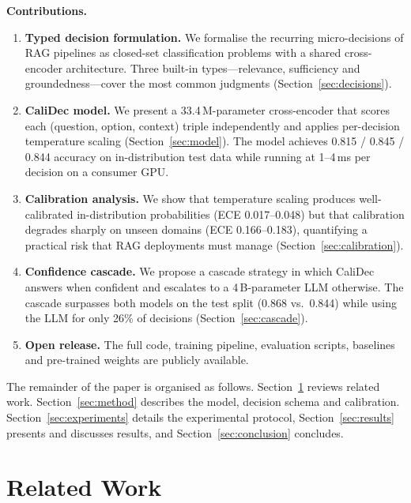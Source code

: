 \documentclass[twocolumn]{ICCKjournal}
\begin{document}
\textbf{Contributions.}
\begin{enumerate}[leftmargin=*]
    \item \textbf{Typed decision formulation.} We formalise the recurring micro-decisions of RAG pipelines as closed-set classification problems with a shared cross-encoder architecture. Three built-in types---relevance, sufficiency and groundedness---cover the most common judgments (Section~\ref{sec:decisions}).
    \item \textbf{CaliDec model.} We present a 33.4\,M-parameter cross-encoder that scores each (question, option, context) triple independently and applies per-decision temperature scaling (Section~\ref{sec:model}). The model achieves 0.815 / 0.845 / 0.844 accuracy on in-distribution test data while running at 1--4\,ms per decision on a consumer GPU.
    \item \textbf{Calibration analysis.} We show that temperature scaling produces well-calibrated in-distribution probabilities (ECE 0.017--0.048) but that calibration degrades sharply on unseen domains (ECE 0.166--0.183), quantifying a practical risk that RAG deployments must manage (Section~\ref{sec:calibration}).
    \item \textbf{Confidence cascade.} We propose a cascade strategy in which CaliDec answers when confident and escalates to a 4\,B-parameter LLM otherwise. The cascade surpasses both models on the test split (0.868 vs.\ 0.844) while using the LLM for only 26\% of decisions (Section~\ref{sec:cascade}).
    \item \textbf{Open release.} The full code, training pipeline, evaluation scripts, baselines and pre-trained weights are publicly available.
\end{enumerate}

The remainder of the paper is organised as follows. Section~\ref{sec:related} reviews related work. Section~\ref{sec:method} describes the model, decision schema and calibration. Section~\ref{sec:experiments} details the experimental protocol, Section~\ref{sec:results} presents and discusses results, and Section~\ref{sec:conclusion} concludes.

\section{Related Work}
\label{sec:related}
\end{document}
